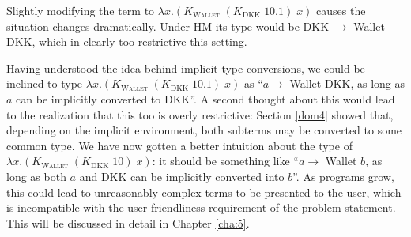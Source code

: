 Slightly modifying the term to \textsc{$\lambda x. (K_{\text{Wallet}}\;(K_{\text{DKK}}\;10.1)\;x)$} causes the situation changes dramatically. Under HM its type would be DKK $\to$ Wallet DKK, which in clearly too restrictive this setting.

Having understood the idea behind implicit type conversions, we could be inclined to type \textsc{$\lambda x. (K_{\text{Wallet}}\;(K_{\text{DKK}}\;10.1)\;x)$} as ``$a \to$ Wallet DKK, as long as $a$ can be implicitly converted to DKK''. A second thought about this would lead to the realization that this too is overly restrictive: Section \ref{dom4} showed that, depending on the implicit environment, both subterms may be converted to some common type. We have now gotten a better intuition about the type of \textsc{$\lambda x. (K_{\text{Wallet}}\;(K_{\text{DKK}}\;10)\;x)$}: it should be something like ``$a \to$ Wallet $b$, as long as both $a$ and DKK can be implicitly converted into $b$''. As programs grow, this could lead to unreasonably complex terms to be presented to the user, which is incompatible with the user-friendliness requirement of the problem statement. This will be discussed in detail in Chapter \ref{cha:5}.




